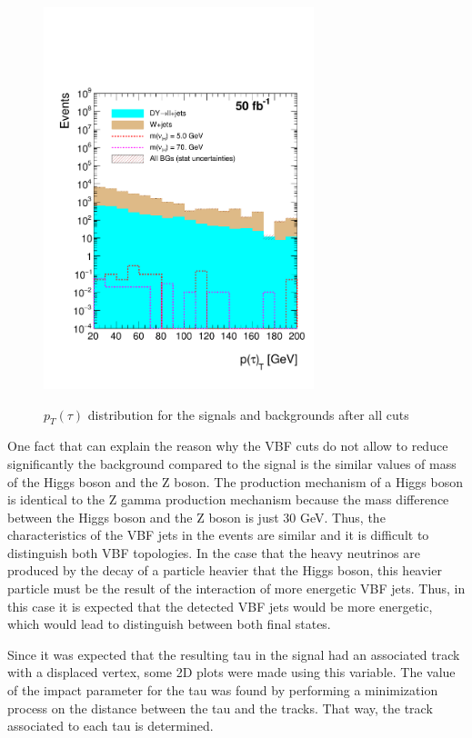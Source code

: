   \begin{figure}[h] 
 \centering
 \caption{$p_T(\tau)$ distribution for the signals and backgrounds after all cuts}
 \includegraphics[width=0.7\textwidth]{./Capitulos/Analysis/AfterVBFCUTS/TauPt_MET20} 
 \label{taupt_VBF}
 \end{figure}  

 
One fact that can explain the reason why the VBF cuts do not allow to reduce significantly the background compared to the signal is the similar values of mass of the Higgs boson and the Z boson.
The production mechanism of a Higgs boson is 
identical to the Z gamma production mechanism because the mass difference between the Higgs boson and the Z boson is just 30 GeV. Thus, the characteristics of the VBF jets in the events are similar
and it is difficult to distinguish both VBF topologies. In the case that the heavy neutrinos are produced by the decay of a particle heavier that the Higgs boson, this heavier particle must be the
result of the interaction of more energetic VBF jets. Thus, in this case it is expected that the detected VBF jets would be more energetic, which would lead to distinguish between both final states.

Since it was expected that the resulting tau in the signal had an associated track with a displaced vertex, some 2D plots were made using this variable. The value of the impact parameter for the tau was found by performing a minimization process on the distance between the tau and the tracks. That way, the track associated to each tau is determined. 


